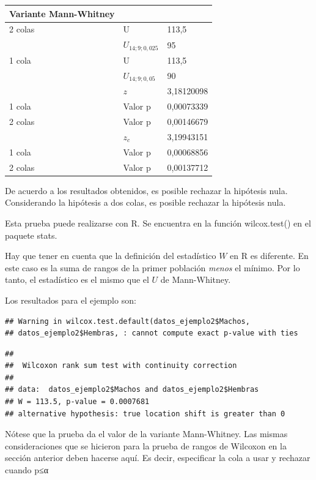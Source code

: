 \documentclass[]{book}
\newenvironment{Shaded}{\begin{snugshade}}{\end{snugshade}}
\newcommand{\DataTypeTok}[1]{\textcolor[rgb]{0.13,0.29,0.53}{#1}}
\newcommand{\KeywordTok}[1]{\textcolor[rgb]{0.13,0.29,0.53}{\textbf{#1}}}
\newcommand{\NormalTok}[1]{#1}
\newcommand{\OperatorTok}[1]{\textcolor[rgb]{0.81,0.36,0.00}{\textbf{#1}}}
\newcommand{\StringTok}[1]{\textcolor[rgb]{0.31,0.60,0.02}{#1}}
\theoremstyle{definition}
\theoremstyle{definition}
\theoremstyle{definition}
\theoremstyle{remark}
\begin{document}
\begin{longtable}[]{@{}lll@{}}
\toprule
Variante Mann-Whitney & &\tabularnewline
\midrule
\endhead
2 colas & U & 113,5\tabularnewline
& \(U_{14;9;0,025}\) & 95\tabularnewline
1 cola & U & 113,5\tabularnewline
& \(U_{14;9;0,05}\) & 90\tabularnewline
& \(z\) & 3,18120098\tabularnewline
1 cola & Valor p & 0,00073339\tabularnewline
2 colas & Valor p & 0,00146679\tabularnewline
& \(z_c\) & 3,19943151\tabularnewline
1 cola & Valor p & 0,00068856\tabularnewline
2 colas & Valor p & 0,00137712\tabularnewline
\bottomrule
\end{longtable}

De acuerdo a los resultados obtenidos, es posible rechazar la hipótesis
nula.\\
Considerando la hipótesis a dos colas, es posible rechazar la hipótesis
nula.

Esta prueba puede realizarse con R. Se encuentra en la función
wilcox.test() en el paquete stats.

Hay que tener en cuenta que la definición del estadístico \(W\) en R es
diferente. En este caso es la suma de rangos de la primer población
\emph{menos} el mínimo. Por lo tanto, el estadístico es el mismo que el
\(U\) de Mann-Whitney.

Los resultados para el ejemplo son:

\begin{Shaded}
\end{Shaded}

\begin{verbatim}
## Warning in wilcox.test.default(datos_ejemplo2$Machos,
## datos_ejemplo2$Hembras, : cannot compute exact p-value with ties
\end{verbatim}

\begin{verbatim}
## 
##  Wilcoxon rank sum test with continuity correction
## 
## data:  datos_ejemplo2$Machos and datos_ejemplo2$Hembras
## W = 113.5, p-value = 0.0007681
## alternative hypothesis: true location shift is greater than 0
\end{verbatim}

Nótese que la prueba da el valor de la variante Mann-Whitney. Las mismas
consideraciones que se hicieron para la prueba de rangos de Wilcoxon en
la sección anterior deben hacerse aquí. Es decir, especificar la cola a
usar y rechazar cuando p≤α
\end{document}
